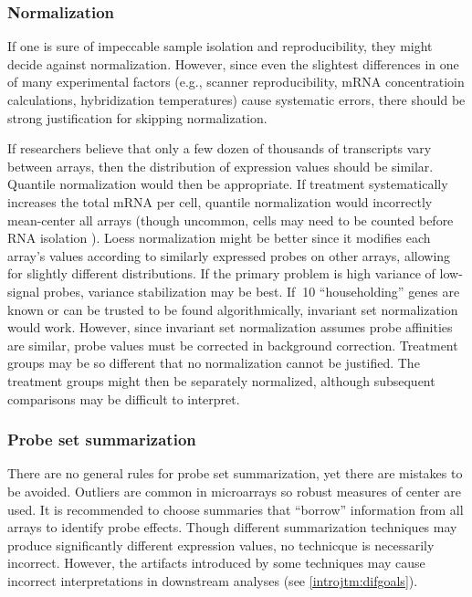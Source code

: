 \subsubsection{Normalization}

If one is sure of impeccable sample isolation and
reproducibility, they might decide against normalization. 
However, since even the slightest differences in one of many experimental factors 
(e.g., scanner reproducibility, mRNA concentratioin calculations, hybridization
temperatures) cause systematic errors, there should be strong 
justification for skipping normalization.

If researchers believe that only a few dozen
of thousands of transcripts vary between arrays, then the distribution
of expression values should be similar. Quantile
normalization would then be appropriate. If treatment
systematically increases the total mRNA per cell, quantile
normalization would incorrectly mean-center all arrays 
(though uncommon, cells may need to be counted before RNA isolation \cite{Loven:2012km}).
Loess normalization might be better since it 
modifies each array's values according to similarly expressed 
probes on other arrays, allowing for slightly different distributions.
If the primary problem is high variance of low-signal probes, variance
stabilization may be best. If $~$10 ``householding'' genes are known
or can be trusted to be found algorithmically, invariant set normalization
would work. However, since invariant set normalization assumes probe affinities
are similar, probe values must be corrected in background correction.
Treatment groups may be so different that
no normalization cannot be justified. The treatment groups might then
be separately normalized, although subsequent comparisons may be difficult to interpret.

\subsubsection{Probe set summarization}

There are no general rules for probe set summarization, yet
there are mistakes to be avoided. Outliers are common in microarrays
so robust measures of center are used.
It is recommended to choose summaries
that ``borrow'' information from all arrays to identify probe effects.
Though different summarization techniques may produce significantly
different expression values, no technicque is necessarily incorrect.
However, the artifacts introduced by some techniques may
cause incorrect interpretations in downstream analyses (see \ref{introjtm:difgoals}).

